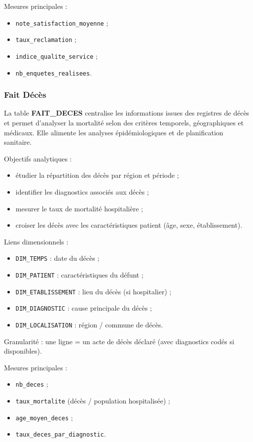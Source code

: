 \documentclass[12pt,a4paper]{article}
\begin{document}
Mesures principales :
\begin{itemize}
    \item \texttt{note\_satisfaction\_moyenne} ;
    \item \texttt{taux\_reclamation} ;
    \item \texttt{indice\_qualite\_service} ;
    \item \texttt{nb\_enquetes\_realisees}.
\end{itemize}

\subsubsection{Fait Décès}

La table \textbf{FAIT\_DECES} centralise les informations issues des registres de décès et permet d’analyser la mortalité selon des critères temporels, géographiques et médicaux. Elle alimente les analyses épidémiologiques et de planification sanitaire.

Objectifs analytiques :
\begin{itemize}
    \item étudier la répartition des décès par région et période ;
    \item identifier les diagnostics associés aux décès ;
    \item mesurer le taux de mortalité hospitalière ;
    \item croiser les décès avec les caractéristiques patient (âge, sexe, établissement).
\end{itemize}

Liens dimensionnels :
\begin{itemize}
    \item \texttt{DIM\_TEMPS} : date du décès ;
    \item \texttt{DIM\_PATIENT} : caractéristiques du défunt ;
    \item \texttt{DIM\_ETABLISSEMENT} : lieu du décès (si hospitalier) ;
    \item \texttt{DIM\_DIAGNOSTIC} : cause principale du décès ;
    \item \texttt{DIM\_LOCALISATION} : région / commune de décès.
\end{itemize}

Granularité : une ligne = un acte de décès déclaré (avec diagnostics codés si disponibles).

Mesures principales :
\begin{itemize}
    \item \texttt{nb\_deces} ;
    \item \texttt{taux\_mortalite} (décès / population hospitalisée) ;
    \item \texttt{age\_moyen\_deces} ;
    \item \texttt{taux\_deces\_par\_diagnostic}.
\end{itemize}
\end{document}
